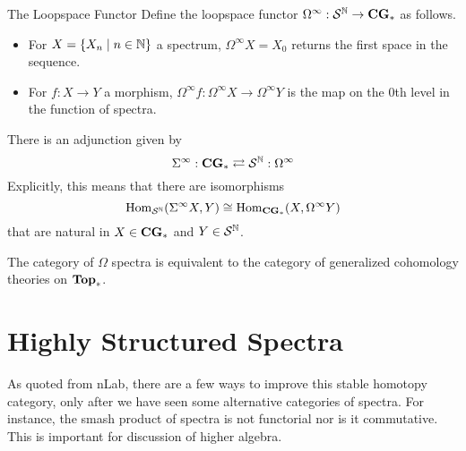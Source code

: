 \documentclass[a4paper]{article}
\begin{document}
\begin{defn}{The Loopspace Functor}{} Define the loopspace functor $\Omega^\infty:\mathcal{S}^{\mathbb{N}}\to\bold{CG}_\ast$ as follows. 
\begin{itemize}
\item For $X=\{X_n\;|\;n\in\mathbb{N}\}$ a spectrum, $\Omega^\infty X=X_0$ returns the first space in the sequence. 
\item For $f:X\to Y$ a morphism, $\Omega^\infty f:\Omega^\infty X\to\Omega^\infty Y$ is the map on the $0$th level in the function of spectra. 
\end{itemize}
\end{defn}

\begin{thm}{}{} There is an adjunction given by $$\Sigma^\infty:\bold{CG}_\ast\rightleftarrows\mathcal{S}^{\mathbb{N}} :\Omega^\infty$$ Explicitly, this means that there are isomorphisms $$\operatorname{Hom}_{\mathcal{S}^{\mathbb{N}} }(\Sigma^\infty X,Y)\cong\operatorname{Hom}_{\bold{CG}_\ast}(X,\Omega^\infty Y)$$ that are natural in $X\in\bold{CG}_\ast$ and $Y\in\mathcal{S}^{\mathbb{N}} $. 
\end{thm}

\begin{thm}{}{} The category of $\Omega$ spectra is equivalent to the category of generalized cohomology theories on $\bold{Top}_\ast$. 
\end{thm}

\pagebreak
\section{Highly Structured Spectra}
As quoted from nLab, there are a few ways to improve this stable homotopy category, only after we have seen some alternative categories of spectra. For instance, the smash product of spectra is not functorial nor is it commutative. This is important for discussion of higher algebra. 
\end{document}
